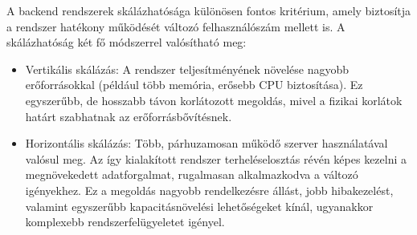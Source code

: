 A backend rendszerek skálázhatósága különösen fontos kritérium, amely biztosítja a rendszer hatékony működését változó felhasználószám mellett is. A skálázhatóság két fő módszerrel valósítható meg:

\begin{itemize}
    \item Vertikális skálázás: A rendszer teljesítményének növelése nagyobb erőforrásokkal (például több memória, erősebb CPU biztosítása). Ez egyszerűbb, de hosszabb távon korlátozott megoldás, mivel a fizikai korlátok határt szabhatnak az erőforrásbővítésnek.
    
    \item Horizontális skálázás: Több, párhuzamosan működő szerver használatával valósul meg. Az így kialakított rendszer terheléselosztás révén képes kezelni a megnövekedett adatforgalmat, rugalmasan alkalmazkodva a változó igényekhez. Ez a megoldás nagyobb rendelkezésre állást, jobb hibakezelést, valamint egyszerűbb kapacitásnövelési lehetőségeket kínál, ugyanakkor komplexebb rendszerfelügyeletet igényel.
\end{itemize}
